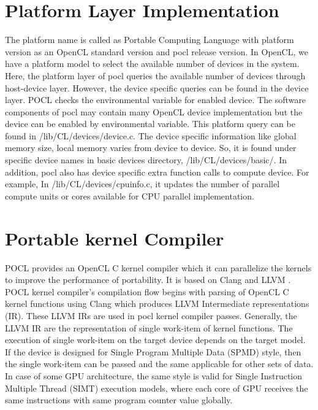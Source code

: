 \section{Platform Layer Implementation}
The platform name is called as Portable Computing Language with platform version as an OpenCL standard version and pocl release version. In OpenCL, we have a platform model to select the available number of devices in the system. Here, the platform layer of pocl queries the available number of devices through host-device layer. However, the device specific queries can be found in the device layer. POCL checks the environmental variable for enabled device. The software components of pocl may contain many OpenCL device implementation but the device can be enabled by environmental variable. This platform query can be found in /lib/CL/devices/device.c. The device specific information like global memory size, local memory varies from device to device. So, it is found under specific device names in basic devices directory, /lib/CL/devices/basic/. In addition, pocl also has device specific extra function calls to compute device. For example, In /lib/CL/devices/cpuinfo.c, it updates the number of parallel compute units or cores available for CPU parallel implementation.

\section{Portable kernel Compiler}
POCL provides an OpenCL C kernel compiler which it can parallelize the kernels to improve the performance of portability. It is based on Clang \cite{19} and LLVM \cite{20}. POCL kernel compiler’s compilation flow begins with parsing of OpenCL C kernel functions using Clang which produces LLVM Intermediate representations (IR). These LLVM IRs are used in pocl kernel compiler passes. Generally, the LLVM IR are the representation of single work-item of kernel functions. The execution of single work-item on the target device depends on the target model. If the device is designed for Single Program Multiple Data (SPMD) style, then the single work-item can be passed and the same applicable for other sets of data. In case of some GPU architecture, the same style is valid for Single Instruction Multiple Thread (SIMT) execution models, where each core of GPU receives the same instructions with same program counter value globally. 

